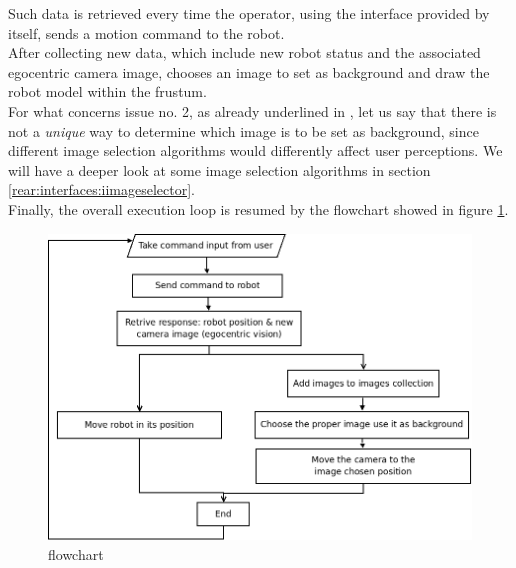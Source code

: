 Such data is retrieved every time the operator, using the 
interface provided by \framework{} itself, sends a 
motion command to the robot.
\\
After collecting new data, which include new robot status and
the associated egocentric camera image, \framework{} chooses 
an image to set as background and draw the robot model within 
the frustum.
\\
For what concerns issue no. 2, as already 
underlined in \cite{sugimoto}, let us say that there is not 
a \textit{unique} way to determine which image is to be set 
as background, since different image selection algorithms 
would differently affect user perceptions. We will have a 
deeper look at some image selection algorithms in section
\ref{rear:interfaces:iimageselector}.
\\
Finally, the overall execution loop is resumed by the flowchart 
showed in figure \ref{fig:overall_diagram}.
\begin{figure}[!h]
  \begin{center}
    \includegraphics[width=\textwidth]{img/overall_diagram.png}
    \caption{\framework{} flowchart}
    \label{fig:overall_diagram}
  \end{center}
\end{figure}

\clearpage

\clearpage

\clearpage

